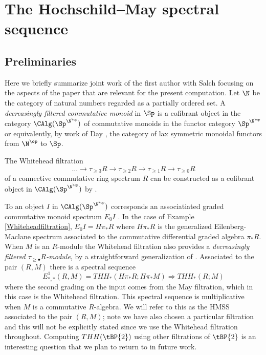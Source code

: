 \section{The Hochschild--May spectral sequence}
\subsection{Preliminaries}
Here we briefly summarize joint work of the first author with Salch \cite{THH-May} focusing on the aspects of the paper that are relevant for the present computation. Let $\N$ be the category of natural numbers regarded as a partially ordered set. A \emph{decreasingly filtered commutative monoid} in $\Sp$ is a cofibrant object in the category $\CAlg(\Sp^{\N^{\op}})$ of commutative monoids in the functor category $\Sp^{\N^{\op}}$ or equivalently, by work of  Day \cite{Day}, the category of lax symmetric monoidal functors from $\N^{\op}$ to $\Sp$. 
\begin{ex}\label{Whiteheadfiltration}
The Whitehead filtration  
\[ \dots \longrightarrow \tau_{\ge 3} R\longrightarrow \tau_{\ge 2} R\longrightarrow \tau_{\ge 1} R \longrightarrow \tau_{\ge 0} R\]
of a connective commutative ring spectrum $R$ can be constructed as a cofibrant object in $\CAlg(\Sp^{\N^{\op}})$ by \cite[Thm. 4.2.1]{THH-May}. 
\end{ex}
To an object $I$ in $\CAlg(\Sp^{\N^{\op}})$ corresponds an associatiated graded commutative monoid spectrum $E_0I$ \cite[Def. 3.1.6]{THH-May}. In the case of Example \ref{Whiteheadfiltration}, $E_0I=H\pi_*R$ where $H\pi_*R$ is the generalized Eilenberg-Maclane spectrum associated to the commutative differential graded algebra $\pi_*R$. When $M$ is an $R$-module the Whitehead filtration also provides a \emph{decreasingly filtered $\tau_{\ge \bullet}R$-module}, by a straightforward generalization of \cite[Thm. 4.2.1]{THH-May}. Associated to the pair $(R,M)$ there is a spectral sequence
\begin{equation}\label{HMSS} E^1_{*,*}(R,M)=THH_*(H\pi_*R;H\pi_*M)\Rightarrow THH_*(R;M)\end{equation}
where the second grading on the input comes from the May filtration, which in this case is the Whitehead filtration. This spectral sequence is multiplicative when $M$ is a commutative $R$-algebra. We will refer to this as the HMSS associated to the pair $(R,M)$; note we have also chosen a particular filtration and this will not be explicitly stated since we use the Whitehead filtration throughout. Computing $THH(\tBP{2})$ using other filtrations of $\tBP{2}$ is an interesting question that we plan to return to in future work. 
 
